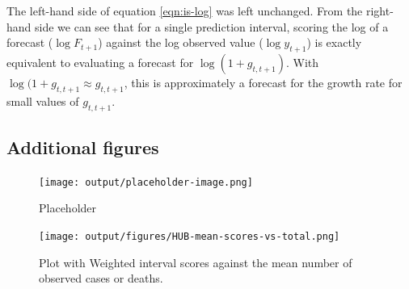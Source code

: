 \documentclass{article}
\begin{document}
The left-hand side of equation \ref{eqn:is-log} was left unchanged. From the right-hand side we can see that for a single prediction interval, scoring the log of a forecast ($\log F_{t+1}$) against the log observed value ($\log y_{t+1}$) is exactly equivalent to evaluating a forecast for $\log (1 + g_{t, t+1})$. With $\log (1 + g_{t, t+1} \approx g_{t, t+1}$, this is approximately a forecast for the growth rate for small values of $g_{t, t+1}$. 


\subsection{Additional figures}




\begin{figure}[h!]
    \centering
    \texttt{[image: output/placeholder-image.png]}
    \caption{Placeholder}
    \label{fig:placeholder}
\end{figure}


\begin{figure}[h!]
    \centering
    \texttt{[image: output/figures/HUB-mean-scores-vs-total.png]}
    \caption{Plot with Weighted interval scores against the mean number of observed cases or deaths.}
    \label{fig:HUB-mean-scores-total}
\end{figure}


\clearpage

\end{document}
